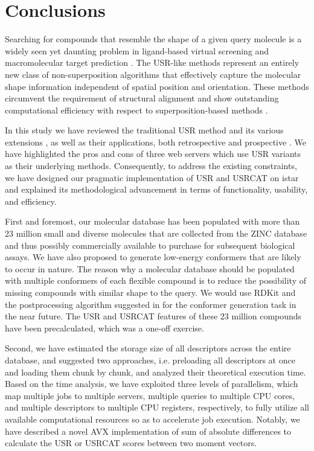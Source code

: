 \section{Conclusions}

Searching for compounds that resemble the shape of a given query molecule is a widely seen yet daunting problem in ligand-based virtual screening \citep{1332,1380,1281,1504,1502,1615} and macromolecular target prediction \citep{1407,1408,1402}. The USR-like methods \citep{1379,1338,1331} represent an entirely new class of non-superposition algorithms that effectively capture the molecular shape information independent of spatial position and orientation. These methods circumvent the requirement of structural alignment and show outstanding computational efficiency with respect to superposition-based methods \citep{1440,887,1439}.

In this study we have reviewed the traditional USR method \citep{1379} and its various extensions \citep{1333,1436,1437,1334,1335,1337,1338,1331,1407,1408}, as well as their applications, both retrospective \citep{1332,1331} and prospective \citep{1505,1380,1281,1504,1502,1615}. We have highlighted the pros and cons of three web servers \citep{1436,1437,1408} which use USR variants as their underlying methods. Consequently, to address the existing constraints, we have designed our pragmatic implementation of USR \citep{1379} and USRCAT \citep{1331} on istar \citep{1362} and explained its methodological advancement in terms of functionality, usability, and efficiency.

First and foremost, our molecular database has been populated with more than 23 million small and diverse molecules that are collected from the ZINC database \citep{532,1178} and thus possibly commercially available to purchase for subsequent biological assays. We have also proposed to generate low-energy conformers that are likely to occur in nature. The reason why a molecular database should be populated with multiple conformers of each flexible compound is to reduce the possibility of missing compounds with similar shape to the query. We would use RDKit and the postprocessing algorithm suggested in \citep{1127} for the conformer generation task in the near future. The USR and USRCAT features of these 23 million compounds have been precalculated, which was a one-off exercise.

Second, we have estimated the storage size of all descriptors across the entire database, and suggested two approaches, i.e. preloading all descriptors at once and loading them chunk by chunk, and analyzed their theoretical execution time. Based on the time analysis, we have exploited three levels of parallelism, which map multiple jobs to multiple servers, multiple queries to multiple CPU cores, and multiple descriptors to multiple CPU registers, respectively, to fully utilize all available computational resources so as to accelerate job execution. Notably, we have described a novel AVX implementation of sum of absolute differences to calculate the USR or USRCAT scores between two moment vectors.

